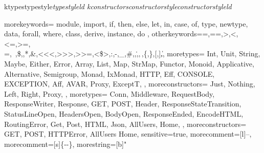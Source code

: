 \makeatletter
\lst@InstallKeywords k{types}{typestyle}\slshape{typestyle}{}ld
\lst@InstallKeywords k{constructors}{constructorstyle}\slshape{constructorstyle}{}ld
\makeatother

{
  morekeywords={
    module,
    import,
    if,
    then,
    else,
    let,
    in,
    case,
    of,
    type,
    newtype,
    data,
    forall,
    where,
    class,
    derive,
    instance,
    do
  },
  otherkeywords={=,==,>,<,<=,>=,\\=,~,\$,\@,*,\&,<<<,>>>,>>=,<\$>,:,-,_,\#,\/,\.,\(,\),\{,\},[,],\|},
  moretypes={
    Int,
    Unit,
    String,
    Maybe,
    Either,
    Error,
    Array,
    List,
    Map,
    StrMap,
    Functor,
    Monoid,
    Applicative,
    Alternative,
    Semigroup,
    Monad,
    IxMonad,
    HTTP,
    Eff,
    CONSOLE,
    EXCEPTION,
    Aff,
    AVAR,
    Proxy,
    ExceptT,
  },
  moreconstructors={
    Just,
    Nothing,
    Left,
    Right,
    Proxy,
  },
  moretypes={
    Conn,
    Middleware,
    RequestBody,
    ResponseWriter,
    Response,
    GET,
    POST,
    Header,
    ResponseStateTransition,
    StatusLineOpen,
    HeadersOpen,
    BodyOpen,
    ResponseEnded,
    EncodeHTML,
    RoutingError,
    Get,
    Post,
    HTML,
    Json,
    AllUsers,
    Home,
  },
  moreconstructors={
    GET,
    POST,
    HTTPError,
    AllUsers
    Home,
  }
  sensitive=true,
  morecomment=[l]{--}, %
  morecomment=[s]{\{-}{-\}}, %
  morestring=[b]" %
}
